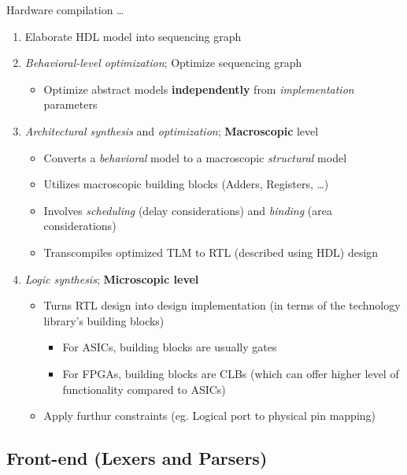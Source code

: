 \documentclass{article}
\begin{document}
Hardware compilation \dots
\begin{enumerate}
    \item Elaborate HDL model into sequencing graph
    \item \textit{Behavioral-level optimization}; Optimize sequencing graph
        \begin{itemize}
            \item Optimize abstract models \textbf{independently} from \textit{implementation} parameters
        \end{itemize}
    \item \textit{Architectural synthesis} and \textit{optimization}; \textbf{Macroscopic} level
        \begin{itemize}
            \item Converts a \textit{behavioral} model to a macroscopic \textit{structural} model
            \item Utilizes macroscopic building blocks (Adders, Registers, \dots)
            \item Involves \textit{scheduling} (delay considerations) and \textit{binding} (area considerations)
            \item Transcompiles optimized TLM to RTL (described using HDL) design
        \end{itemize}
    \item \textit{Logic synthesis}; \textbf{Microscopic level}
        \begin{itemize}
            \item Turns RTL design into design implementation (in terms of the technology library's building blocks)
                \begin{itemize}
                    \item For ASICs, building blocks are usually gates
                    \item For FPGAs, building blocks are CLBs (which can offer higher level of functionality compared to ASICs)
                \end{itemize}
            \item Apply furthur constraints (eg. Logical port to physical pin mapping)
        \end{itemize}
\end{enumerate}

\subsection{Front-end (Lexers and Parsers)}
\end{document}
